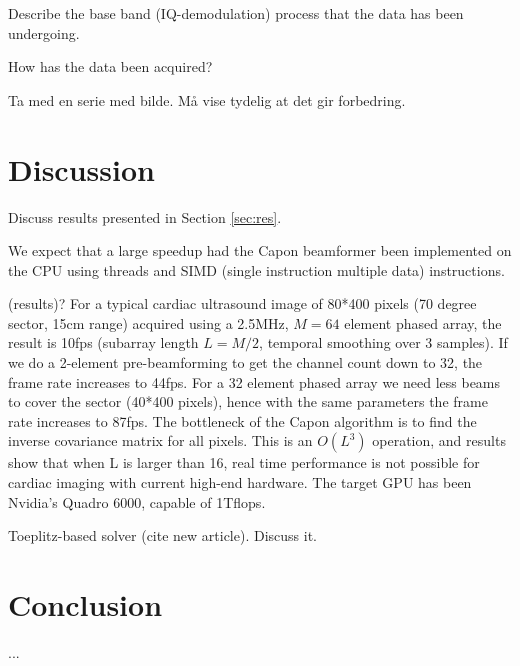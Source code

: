 \documentclass[journal]{IEEEtran}
\begin{document}
Describe the base band (IQ-demodulation) process that the data has been undergoing.

How has the data been acquired?

Ta med en serie med bilde. Må vise tydelig at det gir forbedring. 

\section{Discussion}\label{sec:dis}
Discuss results presented in Section \ref{sec:res}.

We expect that a large speedup had the Capon beamformer been implemented on the CPU using threads and SIMD (single instruction multiple data) instructions. 

(results)?
For a typical cardiac ultrasound image of 80*400 pixels (70 degree sector, 15cm range) acquired using a 2.5MHz, $M=64$ element phased array, the result is 10fps (subarray length $L=M/2$, temporal smoothing over 3 samples). If we do a 2-element pre-beamforming to get the channel count down to 32, the frame rate increases to 44fps. For a 32 element phased array we need less beams to cover the sector (40*400 pixels), hence with the same parameters the frame rate increases to 87fps. The bottleneck of the Capon algorithm is to find the inverse covariance matrix for all pixels. This is an $O(L^3)$ operation, and results show that when L is larger than 16, real time performance is not possible for cardiac imaging with current high-end hardware. The target GPU has been Nvidia’s Quadro 6000, capable of 1Tflops.

Toeplitz-based solver (cite new article). Discuss it.

\section{Conclusion}\label{sec:con}
...


%
%
\end{document}
